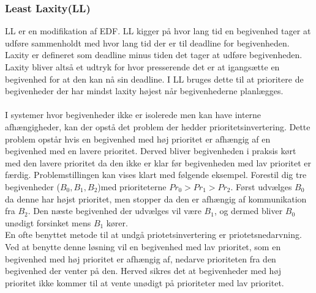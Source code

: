 \subsubsection{Least Laxity(LL)}
LL er en modifikation af EDF. LL kigger på hvor lang tid en begivenhed tager at udføre sammenholdt med hvor lang tid der er til deadline for begivenheden. Laxity er defineret som deadline minus tiden det tager at udføre begivenheden. Laxity bliver altså et udtryk for hvor presserende det er at igangsætte en begivenhed for at den kan nå sin deadline. I LL bruges dette til at prioritere de begivenheder der har mindst laxity højest når begivenhederne planlægges. \\
\\
I systemer hvor begivenheder ikke er isolerede men kan have interne afhængigheder, kan der opstå det problem der hedder prioritetsinvertering\cite{sha1990priority}. Dette problem opstår hvis en begivenhed med høj prioritet er afhængig af en begivenhed med en lavere prioritet. Derved bliver begivenheden i praksis kørt med den lavere prioritet da den ikke er klar før begivenheden med lav prioritet er færdig. Problemstillingen kan vises klart med følgende eksempel. Forestil dig tre begivenheder ($B_0,B_1,B_2$)med prioriteterne $Pr_0>Pr_1>Pr_2$. Først udvælges $B_0$ da denne har højst prioritet, men stopper da den er afhængig af kommunikation fra $B_2$. Den næste begivenhed der udvælges vil være $B_1$, og dermed bliver $B_0$ unødigt forsinket mens $B_1$ kører.\\
En ofte benyttet metode til at undgå priotetsinvertering er priotetsnedarvning. Ved at benytte denne løsning vil en begivenhed med lav prioritet, som en begivenhed med høj prioritet er afhængig af, nedarve prioriteten fra den begivenhed der venter på den. Herved sikres det at begivenheder med høj prioritet ikke kommer til at vente unødigt på prioriteter med lav prioritet. 

